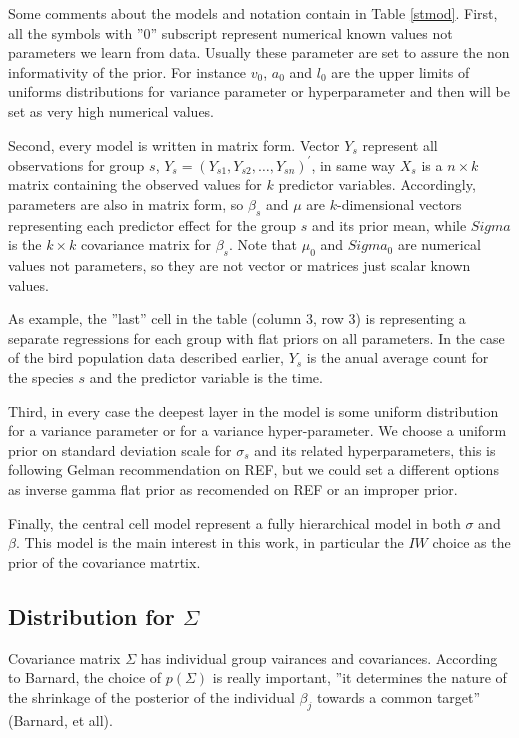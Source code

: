 \documentclass{article}
\begin{document}
Some comments about the models and notation contain in Table \ref{stmod}. 
First, all the symbols with ''0'' subscript represent numerical known values not parameters we learn from data. Usually these parameter are set to assure the non informativity of the prior. For instance $v_0$, $a_0$ and $l_0$ are the upper limits of uniforms distributions for variance parameter or hyperparameter and then will be set as very high numerical values. 

Second, every model is written in matrix form. Vector $Y_s$ represent all observations for group $s$, $Y_s =  (Y_{s1},Y_{s2},\dots,Y_{sn})^{'}$, in same way $X_s$ is a $n \times k$ matrix containing the observed values for $k$ predictor variables. Accordingly, parameters are also in matrix form, so $\beta_s$ and $\mu$ are $k$-dimensional vectors representing each predictor effect for the group $s$ and its prior mean, while $Sigma$ is the $k\times k$ covariance matrix for $\beta_s$. Note that $\mu_0$ and $Sigma_0$ are numerical values not parameters, so they are not vector or matrices just scalar known values. 

As example, the ''last'' cell in the table (column 3, row 3) is representing a separate regressions for each group with flat priors on all parameters. In the case of the bird population data described earlier, $Y_s$ is the anual average count for the species $s$ and the predictor variable is the time.  

Third, in every case the deepest layer in the model is some uniform distribution for a variance parameter or for a variance hyper-parameter. We choose a uniform prior on standard deviation scale for $\sigma_s$ and its related hyperparameters, this is following Gelman recommendation on REF, but we could set a different options as inverse gamma flat prior as recomended on REF or an improper prior. 

Finally, the central cell model represent a fully hierarchical model in both $\sigma$ and $\beta$. This model is the main interest in this work, in particular the $IW$ choice as the prior of the covariance matrtix. 
 
\subsection{Distribution for $\Sigma$}

Covariance matrix $\Sigma$ has individual group vairances and covariances. According to Barnard, the choice of $p(\Sigma)$ is really important, ''it determines the nature of the shrinkage of the posterior of the individual $\beta_j$ towards a common target'' (Barnard, et all). 
\end{document}
